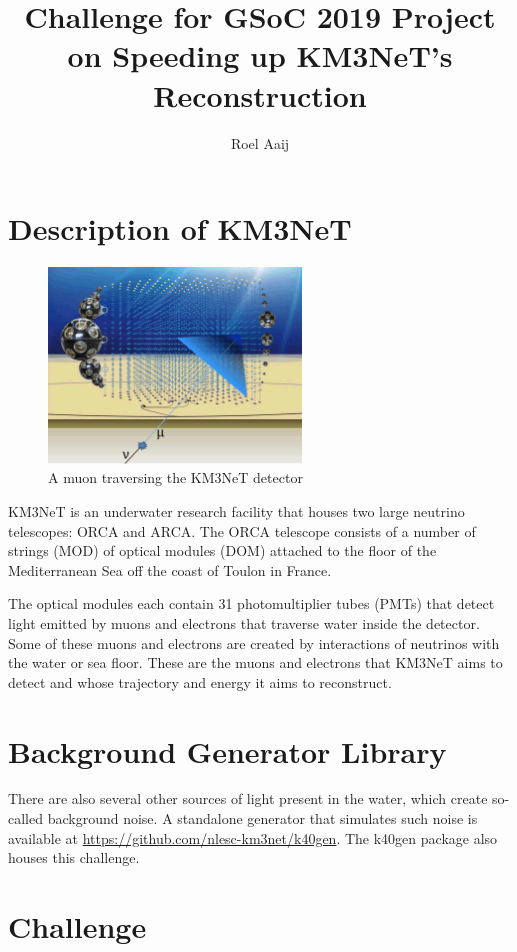 \documentclass{article}
\title{Challenge for GSoC 2019 Project on Speeding up KM3NeT's Reconstruction}
\author{Roel Aaij}
\begin{document}
\section{Description of KM3NeT}

\begin{figure}
  \center
  \includegraphics[width=0.6\textwidth]{KM3NeT-NeutrinoToMuon.png}
  \caption{A muon traversing the KM3NeT detector}
\end{figure}

KM3NeT is an underwater research facility that houses two large
neutrino telescopes: ORCA and ARCA. The ORCA telescope consists of a
number of strings (MOD) of optical modules (DOM) attached to the floor
of the Mediterranean Sea off the coast of Toulon in France.

The optical modules each contain 31 photomultiplier tubes (PMTs) that
detect light emitted by muons and electrons that traverse water inside
the detector. Some of these muons and electrons are created by
interactions of neutrinos with the water or sea floor. These are the
muons and electrons that KM3NeT aims to detect and whose trajectory
and energy it aims to reconstruct.

\section{Background Generator Library}

There are also several other sources of light present in the water,
which create so-called background noise. A standalone generator that
simulates such noise is available at
\href{https://github.com/nlesc-km3net/k40gen}{https://github.com/nlesc-km3net/k40gen}. The
k40gen package also houses this challenge.

\section{Challenge}
\end{document}
